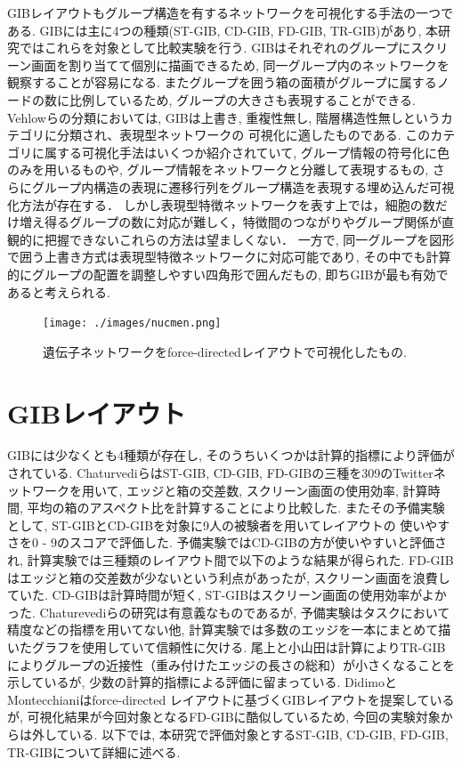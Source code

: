 \documentclass{kuee}
\begin{document}
GIBレイアウトもグループ構造を有するネットワークを可視化する手法の一つである\cite{chaturvedi2014group,onoue2017optimal,rodrigues2011group}.
GIBには主に4つの種類(ST-GIB, CD-GIB, FD-GIB, TR-GIB)があり, 本研究ではこれらを対象として比較実験を行う.
GIBはそれぞれのグループにスクリーン画面を割り当てて個別に描画できるため, 同一グループ内のネットワークを観察することが容易になる.
またグループを囲う箱の面積がグループに属するノードの数に比例しているため, グループの大きさも表現することができる.
Vehlowらの分類においては, GIBは上書き, 重複性無し, 階層構造性無しというカテゴリに分類され、表現型ネットワークの
可視化に適したものである.
このカテゴリに属する可視化手法はいくつか紹介されていて\cite{chaturvedi2014group,henry2007nodetrix,shneiderman2006network,bach2013graphdiaries,dekker2001visualisation}, グループ情報の符号化に色のみを用いるものや, グループ情報をネットワークと分離して表現するもの, さらにグループ内構造の表現に遷移行列をグループ構造を表現する埋め込んだ可視化方法が存在する．
しかし表現型特徴ネットワークを表す上では，細胞の数だけ増え得るグループの数に対応が難しく，特徴間のつながりやグループ関係が直観的に把握できないこれらの方法は望ましくない．
一方で, 同一グループを図形で囲う上書き方式は表現型特徴ネットワークに対応可能であり, その中でも計算的にグループの配置を調整しやすい四角形で囲んだもの, 即ちGIBが最も有効であると考えられる.

\begin{figure}
  \centering
  \texttt{[image: ./images/nucmen.png]}
  \caption{遺伝子ネットワークをforce-directedレイアウトで可視化したもの.  \label{fig:gene}}
\end{figure}

\section{GIBレイアウト}
\label{sec:GIB}
GIBには少なくとも4種類が存在し, そのうちいくつかは計算的指標により評価がされている.
ChaturvediらはST-GIB, CD-GIB, FD-GIBの三種を309のTwitterネットワークを用いて, エッジと箱の交差数, スクリーン画面の使用効率, 計算時間, 平均の箱のアスペクト比を計算することにより比較した\cite{chaturvedi2014group}.
またその予備実験として, ST-GIBとCD-GIBを対象に9人の被験者を用いてレイアウトの
使いやすさを0 - 9のスコアで評価した.
予備実験ではCD-GIBの方が使いやすいと評価され, 計算実験では三種類のレイアウト間で以下のような結果が得られた.
FD-GIBはエッジと箱の交差数が少ないという利点があったが, スクリーン画面を浪費していた.
CD-GIBは計算時間が短く, ST-GIBはスクリーン画面の使用効率がよかった.
Chaturevediらの研究は有意義なものであるが, 予備実験はタスクにおいて精度などの指標を用いてない他, 計算実験では多数のエッジを一本にまとめて描いたグラフを使用していて信頼性に欠ける.
尾上と小山田は計算によりTR-GIBによりグループの近接性（重み付けたエッジの長さの総和）が小さくなることを示しているが, 少数の計算的指標による評価に留まっている\cite{onoue2017optimal}.
DidimoとMontecchianiはforce-directed レイアウトに基づくGIBレイアウトを提案している\cite{6295786}が, 可視化結果が今回対象となるFD-GIBに酷似しているため, 今回の実験対象からは外している.
以下では, 本研究で評価対象とするST-GIB, CD-GIB, FD-GIB, TR-GIBについて詳細に述べる.
\end{document}
